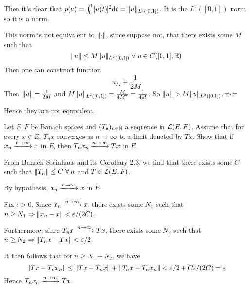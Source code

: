 \documentclass[a4paper, 10pt]{article}
\begin{document}
\begin{solution}
    Then it's clear that $p(u) = \int_{0}^{1} \lvert u(t)\rvert^2 \mathrm{d} t = \lVert u\rVert_{L^2([0, 1])}$. It is the $L^2([0, 1])$ norm so it is a norm.

    This norm is not equivalent to $\lVert\cdot\rVert$, since suppose not, that there exists some $M$ such that \begin{equation*}
    \norm{u} \leq M \norm{u}_{L^2([0, 1])} \forall u \in C([0, 1], \bbr)
    \end{equation*}
    Then one can construct function \begin{equation*}
    u_M \equiv \frac{1}{2M}
    \end{equation*}
    Then $\lVert u\rVert = \frac{1}{2M}$ and $M\lVert u\rVert_{L^2([0, 1])} = \frac{M}{4M^2} = \frac{1}{4M}$. So $\lVert u\rVert > M \lVert u\rVert_{L^2([0, 1])}, \Rightarrow\Leftarrow$

    Hence they are not equivalent.
\end{solution}

\begin{problem} 
    Let $E, F$ be Banach spaces and $(T_n)_{n \in \mathbb{N}}$ a sequence in $\mathcal{L}(E, F)$. Assume that for every $x \in E$, $T_n x$ converges as $n \to \infty$ to a limit denoted by $Tx$. Show that if $x_n \xrightarrow{n \to \infty} x$ in $E$, then $T_n x_n \xrightarrow{n \to \infty} Tx$ in $F$.
\end{problem}
\begin{solution}
    From Banach-Steinhaus and its Corollary 2.3, we find that there exists some $C$ such that $\norm{T_n} \leq C \forall n$ and $T \in \mathcal{L}(E, F)$.

    By hypothesis, $x_n \xrightarrow{n \to \infty} x$ in $E$.

    Fix $\epsilon > 0$. Since $x_n \xrightarrow{n \to \infty} x$, there exists some $N_1$ such that $n \geq N_1 \Rightarrow \lVert x_n - x\rVert < \varepsilon/(2C)$.

    Furthermore, since $T_n x \xrightarrow{n \to \infty} Tx$, there exists some $N_2$ such that $n \geq N_2 \Rightarrow \lVert T_nx - Tx\rVert < \varepsilon/2$.

    It then follows that for $n \geq N_1 + N_2$, we have \begin{equation*}
    \lVert Tx - T_n x_n\rVert \leq \lVert Tx - T_nx\rVert + \lVert T_n x - T_n x_n\rVert < \varepsilon/2 + C \varepsilon/(2C) = \varepsilon
    \end{equation*}
    Hence $T_n x_n \xrightarrow{n \to \infty} Tx$.
\end{solution}
\end{document}
